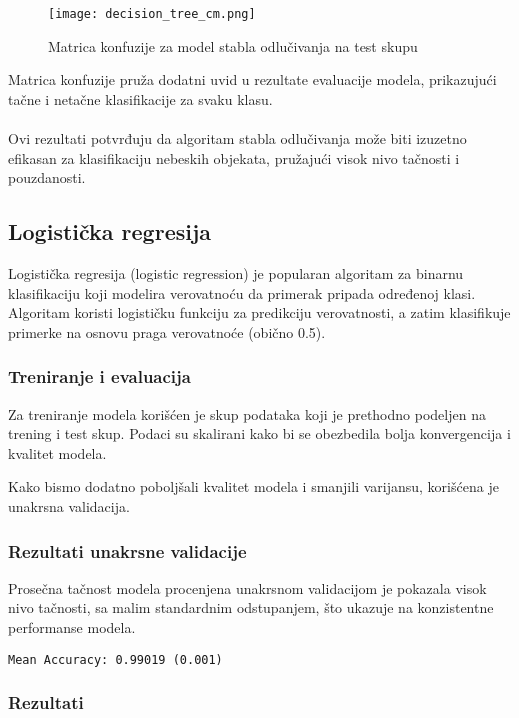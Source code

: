 \documentclass[a4paper,12pt]{article}
\begin{document}
\begin{figure}[H]
\centering
\texttt{[image: decision\_tree\_cm.png]}
\caption{Matrica konfuzije za model stabla odlučivanja na test skupu}
\label{fig:decision_tree_cm}
\end{figure}

Matrica konfuzije pruža dodatni uvid u rezultate evaluacije modela, prikazujući tačne i netačne klasifikacije za svaku klasu.
\\\\Ovi rezultati potvrđuju da algoritam stabla odlučivanja može biti izuzetno efikasan za klasifikaciju nebeskih objekata, pružajući visok nivo tačnosti i pouzdanosti.

\subsection{Logistička regresija}
Logistička regresija (logistic regression) je popularan algoritam za binarnu klasifikaciju koji modelira verovatnoću da primerak pripada određenoj klasi. Algoritam koristi logističku funkciju za predikciju verovatnosti, a zatim klasifikuje primerke na osnovu praga verovatnoće (obično 0.5).

\subsubsection{Treniranje i evaluacija}
Za treniranje modela korišćen je skup podataka koji je prethodno podeljen na trening i test skup. Podaci su skalirani kako bi se obezbedila bolja konvergencija i kvalitet modela.

Kako bismo dodatno poboljšali kvalitet modela i smanjili varijansu, korišćena je unakrsna validacija.

\subsubsection{Rezultati unakrsne validacije}
Prosečna tačnost modela procenjena unakrsnom validacijom je pokazala visok nivo tačnosti, sa malim standardnim odstupanjem, što ukazuje na konzistentne performanse modela.

\begin{verbatim}
Mean Accuracy: 0.99019 (0.001)
\end{verbatim}

\subsubsection{Rezultati}
\end{document}
